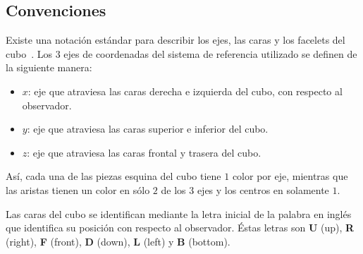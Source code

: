 \subsection{Convenciones}
Existe una notación estándar para describir los ejes, las caras y los facelets del cubo~\cite{notationsingmaster}.
Los $3$ ejes de coordenadas del sistema de referencia utilizado se definen de la siguiente manera:
\begin{itemize}
	\item $x$: eje que atraviesa las caras derecha e izquierda del cubo, con respecto al observador.
	\item $y$: eje que atraviesa las caras superior e inferior del cubo.
	\item $z$: eje que atraviesa las caras frontal y trasera del cubo.
\end{itemize}
Así, cada una de las piezas esquina del cubo tiene $1$ color por eje, mientras que las aristas tienen un color en sólo $2$ de los $3$ ejes y los centros en solamente $1$.

Las caras del cubo se identifican mediante la letra inicial de la palabra en inglés que identifica su posición con respecto al observador.
Éstas letras son \textbf{U} (up), \textbf{R} (right), \textbf{F} (front), \textbf{D} (down), \textbf{L} (left) y \textbf{B} (bottom).


